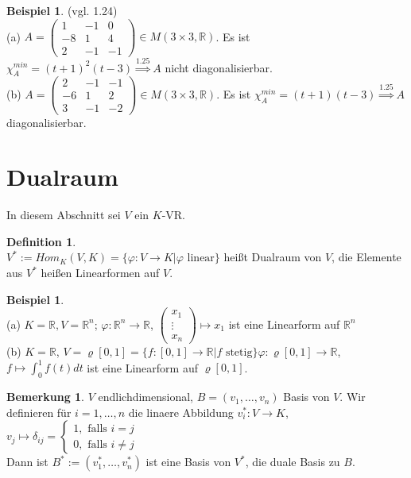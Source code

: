 \documentclass[10pt,a4paper,numbers=endperiod]{scrartcl}
\theoremstyle{definition}
\newtheorem{defi}[satz]{Definition}
\newtheorem{bem}[satz]{Bemerkung}
\newtheorem{bsp}[satz]{Beispiel}
\def\RR{{\mathbb R}}
\begin{document}
\begin{bsp}
	(vgl. 1.24)\\
	(a) $A = \begin{pmatrix}
	1 & -1 & 0\\
	-8 & 1 & 4\\
	2 & -1 & -1	
	\end{pmatrix} \in M(3 \times 3, \RR)$. Es ist $\chi_A^{min} = (t+1)^2(t-3) \overset{1.25}{\Rightarrow} A$ nicht diagonalisierbar.\\
	(b) $A = \begin{pmatrix}
	2 & -1 & -1\\
	-6 & 1 & 2\\
	3 & -1 & -2 
	\end{pmatrix} \in M(3 \times 3, \RR)$. Es ist $\chi_A^{min} = (t+1)(t-3) \overset{1.25}{\Rightarrow} A$ diagonalisierbar.
\end{bsp}
\newpage
\section{Dualraum}

In diesem Abschnitt sei $V$ ein $K$-VR.\\

\begin{defi}
	$ $\\
	$V^* := Hom_K(V,K) = \{\varphi: V \rightarrow K| \varphi \text{ linear}\}$ heißt Dualraum von $V$, die Elemente aus $V^*$ heißen Linearformen auf $V$.
\end{defi}

\begin{bsp}
	$ $\\
	(a) $K = \RR, V = \RR^n$; $\varphi: \RR^n \rightarrow \RR$, $\begin{pmatrix}
	x_1\\
	\vdots\\
	x_n
	\end{pmatrix} \mapsto x_1$ ist eine Linearform auf $\RR^n$\\
	(b) $K = \RR$, $V = \varrho [0,1] = \{f : [0,1] \rightarrow \RR| f \text{ stetig}\} \varphi: \varrho [0,1] \rightarrow \RR$, $f \mapsto \int_{0}^{1} f(t) dt$ ist eine Linearform auf $\varrho [0,1]$.
\end{bsp}

\begin{bem}
	$V$ endlichdimensional, $B = (v_1, \ldots, v_n)$ Basis von $V$. Wir definieren für $i = 1, \ldots, n$ die linaere Abbildung $v_i^*: V \rightarrow K$, $v_j \mapsto \delta_{ij} = \begin{cases}
	1, \text{ falls $i = j$}\\
	0, \text{ falls $i \neq j$} 
	\end{cases}$\\
	 Dann ist $B^* := (v_1^*, \ldots, v_n^*)$ ist eine Basis von $V^*$, die duale Basis zu $B$. 
\end{bem}
\end{document}
